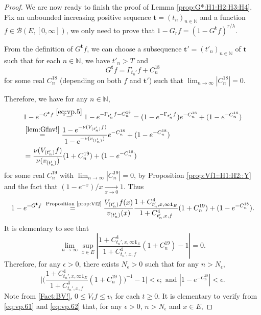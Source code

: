 \documentclass[12pt,a4paper]{amsart}
\numberwithin{equation}{section}
\theoremstyle{plain}
\theoremstyle{definition}
\theoremstyle{remark}
\begin{document}
\begin{proof}
	We are now ready to finish the proof of Lemma \ref{prop:G*:H1:H2:H3:H4}.
	Fix an unbounded increasing positive sequence $\mathbf t=(t_n)_{n\in \mathbb N}$ and a function $f\in \mathcal B(E,[0,\infty])$, we only need to  prove that $1-G_r f =(1- G^{\mathbf t}f)^{r/\lambda}.$
	
	From the definition of $G^{\mathbf t} f$, we can choose a subsequence $\mathbf t'=(t'_n)_{n \in \mathbb N}$ of $\mathbf t$ such that for each $n\in \mathbb N$, we have $t'_n > T$ and
\begin{equation} \label{eq:vp.5}
		G^{\mathbf t}f = \Gamma_{t_n'}f + C^{18}_n
\end{equation}	
for some real $C^{18}_n$ (depending on both $f$ and $\mathbf t'$) such that $\lim_{n\to \infty} |C^{18}_n| =0$.	
	
Therefore, we have for any $n \in \mathbb N$,
\begin{align}
	& 1 - e^{- G^{\mathbf t}f}
		\overset{\eqref{eq:vp.5}}= 1 - e^{- \Gamma_{t'_n} f  - C^{18}_n}
		= (1 - e^{- \Gamma_{t'_n} f }) e^{- C^{18}_n} + (1 - e^{-C_n^{18}})
		\\&\overset{\eqref{lem:Gfnv!}}= \frac{1 - e^{- \nu( V_{(t_n')}f)}}{1- e^{- \nu(v_{(t_n')})}}  e^{ - C^{18}_n} + (1 - e^{-C_n^{18}})
		\\& \label{eq:vp.6}=
	\frac{\nu (V_{(t_n')} f)}{\nu(v_{(t_n')})}  (1+C^{19}_n) + (1 - e^{-C_n^{18}})
\end{align}
for some real $C^{19}_n$ with $\lim_{n\to \infty} |C^{19}_n| =0$, by Proposition
 \ref{prop:Vf1::H1:H2::Y} and the fact that $(1- e^{-x})/x \xrightarrow[x\to 0]{}1$.
	Thus
\begin{equation} \label{eq:vp.61}
	1 - e^{- G^{\mathbf t}f}
	 \overset{\text{ Proposition \ref{prop:Vf2}}}=  \frac{V_{(t_n')}f(x)}{v_{(t_n')}(x)}
\frac{1+C^4_{t_n',x,\infty \mathbf 1_E}}{1+C^4_{t_n',x,f}} (1+C^{19}_n) + (1 - e^{-C^{18}_n}).
\end{equation}
	It is elementary to see that
	\[
	\lim_{n\to \infty} \sup_{x\in E} \left|\frac{1+C^4_{t_n',x,\infty \mathbf 1_E}}{1+C^4_{t_n',x,f}} (1+C^{19}_n) -1 \right| = 0.
	\]
	Therefore, for any $\epsilon > 0$, there exists $N_\epsilon>0$ such that for any $n>N_\epsilon$,
\begin{equation} \label{eq:vp.62}
	\Big| \Big(\frac{1+C^4_{t_n',x,\infty \mathbf 1_E}}{1+C^4_{t_n',x,f}} (1+C^{19}_n)\Big)^{-1} -1 \Big| < \epsilon;
	\text{~and~} |1 - e^{-C^{18}_n}| < \epsilon.
\end{equation}
	Note from \eqref{Fact:BV!}, $0 \leq V_tf \leq v_t$ for each $t\geq 0$.
	It is elementary to verify from \eqref{eq:vp.61} and \eqref{eq:vp.62} that, for any $\epsilon>0$, $n>N_\epsilon$ and $x\in E$,

\end{proof}
\end{document}

